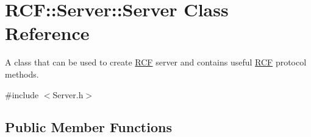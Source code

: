 \hypertarget{class_r_c_f_1_1_server_1_1_server}{}\section{R\+C\+F\+:\+:Server\+:\+:Server Class Reference}
\label{class_r_c_f_1_1_server_1_1_server}


A class that can be used to create \hyperlink{namespace_r_c_f}{R\+C\+F} server and contains useful \hyperlink{namespace_r_c_f}{R\+C\+F} protocol methods.  




{\ttfamily \#include $<$Server.\+h$>$}

\subsection*{Public Member Functions}
